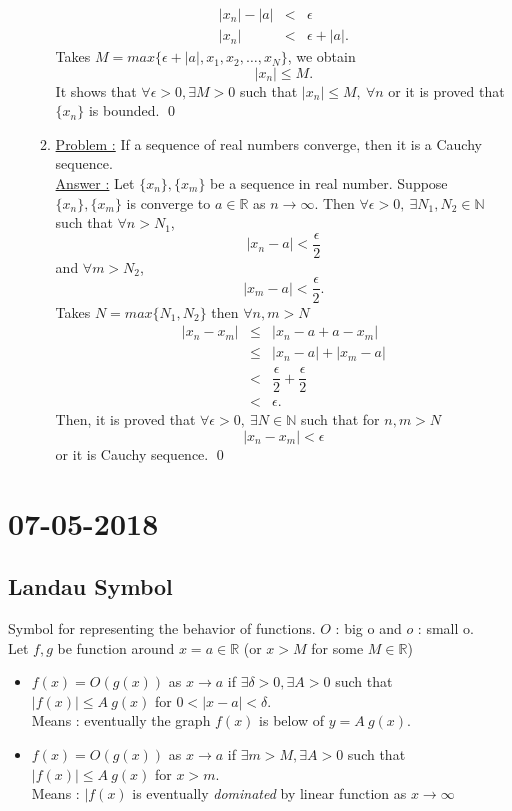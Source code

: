 \documentclass[a4paper,10pt]{article}
\newcommand{\R}{\mathbb{R}}
\newcommand{\N}{\mathbb{N}}
\begin{document}
\begin{enumerate}
\begin{enumerate}
\begin{eqnarray}
		|x_{n}|-|a| &<& \epsilon \\ \nonumber
		|x_{n}| &<& \epsilon + |a|.
		\end{eqnarray}
		Takes $ M = max\{ \epsilon + |a|, x_{1}, x_{2}, \dots, x_{N} \} $, we obtain
		\[ |x_{n}| \leq M. \]
		It shows that $ \forall \epsilon>0, \exists M>0 $ such that $ |x_{n}| \leq M, \ \forall n $ or it is proved that $ \{x_{n}\} $ is bounded. \qed
		\item \underline{Problem :} If a sequence of real numbers converge, then it is a Cauchy sequence.\\
		\underline{Answer :} Let $ \{x_{n}\}, \{x_{m}\} $ be a sequence in real number. Suppose $ \{x_{n}\}, \{x_{m}\} $ is converge to $ a \in \R $ as $ n \rightarrow \infty $. Then $ \forall \epsilon > 0, \ \exists N_{1},N_{2}\in \N $ such that $ \forall n > N_{1} $, \[|x_{n}-a|<\dfrac{\epsilon}{2}\]
		and  $ \forall m > N_{2} $, \[|x_{m}-a|<\dfrac{\epsilon}{2}.\]
		Takes $ N=max\{N_{1},N_{2}\} $ then $ \forall n, m > N $
		\begin{eqnarray}\nonumber
		|x_{n}-x_{m}| & \leq & |x_{n}-a+a-x_{m}| \\ \nonumber
		& \leq & |x_{n}-a|+|x_{m}-a| \\ \nonumber
		& < & \dfrac{\epsilon}{2}+\dfrac{\epsilon}{2} \\ \nonumber
		& < & \epsilon.		
		\end{eqnarray}
		Then, it is proved that $ \forall \epsilon>0, \ \exists N \in \N $ such that for $ n,m > N $ \[ |x_{n}-x_{m}|<\epsilon \] or it is Cauchy sequence. \qed
	\end{enumerate}
\end{enumerate}

\newpage
\section{07-05-2018}

\subsection{Landau Symbol}
Symbol for representing the behavior of functions. $ O $ : big o and $ o $ : small o.\\
Let $ f,g $ be function around $ x=a \in \R $ (or $ x>M $ for some $ M \in \R $)
\begin{itemize}
	\item $ f(x) = O(g(x)) $ as $ x \rightarrow a $ if $ \exists \delta>0, \exists A>0 $ such that $ |f(x)| \leq A \ g(x) $ for $ 0 < |x-a| < \delta $.\\ Means : eventually the graph $ f(x) $ is below of $ y=A \ g(x) $.
	\item $ f(x) = O(g(x)) $ as $ x \rightarrow a $ if $ \exists m > M, \exists A>0 $ such that $ |f(x)| \leq A \ g(x) $ for $ x>m $. \\ Means : $ |f(x) $ is eventually \textit{dominated} by linear function as $ x \rightarrow \infty $
\end{itemize}
\end{document}
